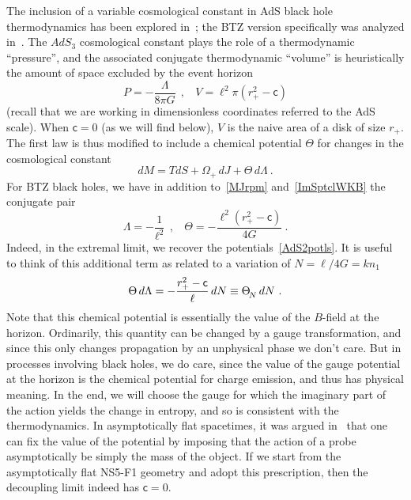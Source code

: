 \documentclass[11pt]{article}
\newcommand{\rcite}{\cite}
\def\ThetaN{{\Theta^{\vphantom{|}}_{\!N}}}
\def\sfc{{\mathsf c}}
\def\be{\begin{equation}}
\def\ee{\end{equation}}
\numberwithin{equation}{section}
\begin{document}
The inclusion of a variable cosmological constant in AdS black hole thermodynamics has been explored in~\rcite{Caldarelli:1999xj,Kastor:2009wy,Cvetic:2010jb}; the BTZ version specifically was analyzed in~\rcite{Wang:2006eb,Dolan:2010zz,Dolan:2010ha}.  The $AdS_3$ cosmological constant plays the role of a thermodynamic ``pressure'', and the associated conjugate thermodynamic ``volume'' is heuristically the amount of space excluded by the event horizon
\be
P = - \frac{\Lambda}{8\pi G}  
~~,~~~~
V = \ell^2 \pi ({r_+^2-\sfc}) 
\ee  
(recall that we are working in dimensionless coordinates referred to the AdS scale).  When $\sfc=0$ (as we will find below), $V$ is the naive area of a disk of size $r_+$.
The first law is thus modified to include a chemical potential $\Theta$ for changes in the cosmological constant
\be
\label{grandcanon}
dM = T  dS + \Omega_+\, dJ + \Theta \, d\Lambda  ~.
\ee
For BTZ black holes, we have in addition to~\eqref{MJrpm} and~\eqref{ImSptclWKB} the conjugate pair
\be
\Lambda = -\frac{1}{\ell^2}
~~,~~~~
\Theta = -\frac{\ell^2(r_+^2-\sfc)}{4G} 
 ~.
\ee
Indeed, in the extremal limit, we recover the potentials~\eqref{AdS2potls}.
It is useful to think of this additional term as related to a variation of $N=\ell/4G=kn_1$
\be
\Theta\, d\Lambda  = -\frac{r_+^2-\sfc}{\ell} \, dN \equiv \ThetaN \, dN  ~.
\ee
Note that this chemical potential is essentially the value of the $B$-field at the horizon.  Ordinarily, this quantity can be changed by a gauge transformation, and since this only changes propagation by an unphysical phase we don't care.  But in processes involving black holes, we do care, since the value of the gauge potential at the horizon is the chemical potential for charge emission, and thus has physical meaning.  In the end, we will choose the gauge for which the imaginary part of the action yields the change in entropy, and so is consistent with the thermodynamics.
In asymptotically flat spacetimes, it was argued in~\rcite{Ferrari:2016vcl} that one can fix the value of the potential by imposing that the action of a probe asymptotically be simply the mass of the object.  If we start from the asymptotically flat NS5-F1 geometry and adopt this prescription, then the decoupling limit indeed has $\sfc=0$.
\end{document}

